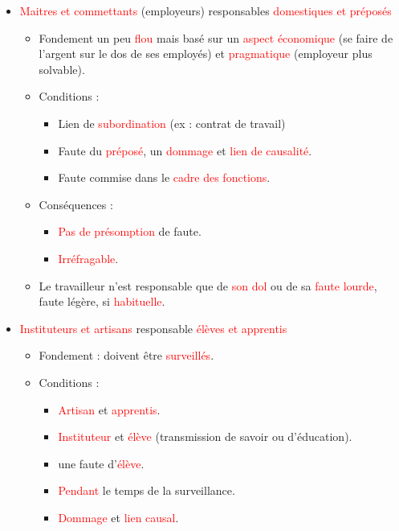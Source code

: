 \begin{itemize}
\begin{itemize}
	\end{itemize}
	\item \textcolor{red}{Maitres et commettants} (employeurs) responsables \textcolor{red}{domestiques et préposés}
	\begin{itemize}
		\item Fondement un peu \textcolor{red}{flou} mais basé sur un \textcolor{red}{aspect économique} (se faire de l'argent sur le dos de ses employés) et \textcolor{red}{pragmatique} (employeur plus solvable).
		\item Conditions :
		\begin{itemize}
			\item Lien de \textcolor{red}{subordination} (ex : contrat de travail)
			\item Faute du \textcolor{red}{préposé}, un \textcolor{red}{dommage} et \textcolor{red}{lien de causalité}.
			\item Faute commise dans le \textcolor{red}{cadre des fonctions}.
		\end{itemize}
		\item Conséquences :
		\begin{itemize}
			\item \textcolor{red}{Pas de présomption} de faute.
			\item \textcolor{red}{Irréfragable}.
		\end{itemize}
		\item Le travailleur n'est responsable que de \textcolor{red}{son dol} ou de sa \textcolor{red}{faute lourde}, faute légère, si \textcolor{red}{habituelle}.
	\end{itemize}
	\item \textcolor{red}{Instituteurs et artisans} responsable \textcolor{red}{élèves et apprentis}
	\begin{itemize}
		\item Fondement : doivent être \textcolor{red}{surveillés}.
		\item Conditions :
		\begin{itemize}
			\item \textcolor{red}{Artisan} et \textcolor{red}{apprentis}.
			\item \textcolor{red}{Instituteur} et \textcolor{red}{élève} (transmission de savoir ou d'éducation).
			\item une faute d'\textcolor{red}{élève}.
			\item \textcolor{red}{Pendant} le temps de la surveillance.
			\item \textcolor{red}{Dommage} et \textcolor{red}{lien causal}.

\end{itemize}
\end{itemize}
\end{itemize}
